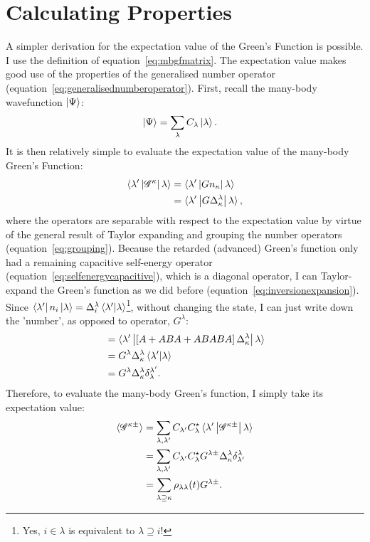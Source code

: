 \section{Calculating Properties}
\label{sec:calcprop}
A simpler derivation for the expectation value of the Green's Function is possible. I use the definition of equation~\ref{eq:mbgfmatrix}. The expectation value makes good use of the properties of the generalised number operator (equation~\ref{eq:generalisednumberoperator}). First, recall the many-body wavefunction $\ket{\Psi}$:
\begin{align*}
\ket{\Psi} &= \sum_\lambda C_\lambda \ket{\lambda}.
\end{align*}
It is then relatively simple to evaluate the expectation value of the many-body Green's Function:
\begin{align*}
\braket{\lambda^\prime \left| \mathscr{G}^\kappa \right| \lambda } &= 
\braket{\lambda^\prime \left|  G n_\kappa \right| \lambda } \\
&= \braket{\lambda^\prime \left| G \Delta^\lambda_\kappa \right| \lambda },
\end{align*} where the operators are separable with respect to the expectation value by virtue of the general result of Taylor expanding and grouping the number operators (equation~\ref{eq:grouping}).
Because the retarded (advanced) Green's function only had a remaining capacitive self-energy operator (equation~\ref{eq:selfenergycapacitive}), which is a diagonal operator, I can Taylor-expand the Green's function as we did before (equation~\ref{eq:inversionexpansion}). Since $\bra{\lambda'}n_i \ket{\lambda}=\Delta^\lambda_i\braket{\lambda'|\lambda}$\footnote{Yes, $i \in \lambda$ is equivalent to $\lambda\supseteq i$!}, without changing the state, I can just write down the 'number', as opposed to operator,  $G^\lambda$:
\begin{align*}
&= \braket{\lambda^\prime \left| \left[ A + ABA + ABABA \right] \Delta^\lambda_\kappa \right| \lambda } \\
&=  G^\lambda \Delta^\lambda_\kappa \braket{\lambda^\prime | \lambda }\\
&=  G^\lambda \Delta^\lambda_\kappa \delta^{\lambda^\prime}_\lambda.
\end{align*}
Therefore, to evaluate the many-body Green's function, I simply take its expectation value:
\begin{align*}
\braket{ \mathscr{G}^{\kappa\pm}} &= \sum_{\lambda,\lambda^\prime}C_{\lambda^\prime}C_\lambda^\star \braket{\lambda^\prime \left| \mathscr{G}^{\kappa\pm} \right| \lambda } \\
&= \sum_{\lambda,\lambda^\prime} C_{\lambda^\prime}C_\lambda^\star  G^{\lambda\pm} \Delta^\lambda_\kappa \delta^\lambda_{\lambda^\prime}\\
&= \sum_{\lambda \supseteq \kappa} \rho_{\lambda\lambda}(t) G^{\lambda\pm} .
\end{align*}
